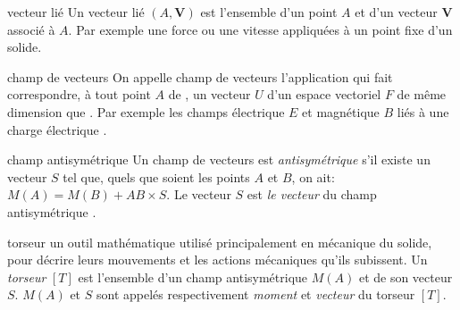 



{vecteur lié}
{Un vecteur lié $(A,\textbf{V})$ est l'ensemble d'un point $A$ et d'un vecteur $\textbf{V}$ associé à $A$. Par exemple une force ou une vitesse appliquées à un point fixe d'un solide.}

{champ de vecteurs}
{On appelle champ de vecteurs l'application qui fait correspondre, à tout point $A$ de \varepsilon, un vecteur $U$ d'un espace vectoriel $F$ de même dimension que \varepsilon. Par exemple les champs électrique $E$ et magnétique $B$ liés à une charge électrique \cite{bib_champVecteurs}.}

{champ antisymétrique}
{Un champ de vecteurs est \emph{antisymétrique} s'il existe un vecteur $S$ tel que, quels que soient les points $A$ et $B$, on ait: $M(A)=M(B)+AB \times S$. Le vecteur $S$ est \emph{le vecteur} du champ antisymétrique \cite{bib_champVecteurs}.}

{torseur}
{un outil mathématique utilisé principalement en mécanique du solide, pour décrire leurs mouvements et les actions mécaniques qu'ils subissent. Un \emph{torseur} $[T]$ est l'ensemble d'un champ antisymétrique $M(A)$ et de son vecteur $S$. $M(A)$ et $S$ sont appelés respectivement \emph{moment} et \emph{vecteur} du torseur $[T]$.}

